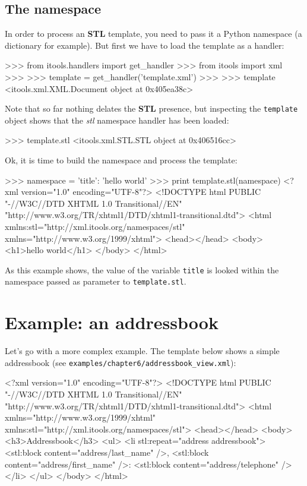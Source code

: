 \subsection{The namespace}

In order to process an {\bf STL} template, you need to pass it a Python
namespace (a dictionary for example). But first we have to load the template
as a handler:

\begin{code}
    >>> from itools.handlers import get_handler
    >>> from itools import xml
    >>>   
    >>> template = get_handler('template.xml')
    >>> 
    >>> template
    <itools.xml.XML.Document object at 0x405ea38c>
\end{code}

Note that so far nothing delates the {\bf STL} presence, but inspecting
the {\tt template} object shows that the {\em stl} namespace handler has
been loaded:

\begin{code}
    >>> template.stl
    <itools.xml.STL.STL object at 0x406516cc>
\end{code}

Ok, it is time to build the namespace and process the template:

\begin{code}
    >>> namespace = {'title': 'hello world'}
    >>> print template.stl(namespace)
    <?xml version="1.0" encoding="UTF-8"?>
    <!DOCTYPE html
         PUBLIC "-//W3C//DTD XHTML 1.0 Transitional//EN"
        "http://www.w3.org/TR/xhtml1/DTD/xhtml1-transitional.dtd">
    <html xmlns:stl="http://xml.itools.org/namespaces/stl"
          xmlns="http://www.w3.org/1999/xhtml">
      <head></head>
      <body>
        <h1>hello world</h1>
      </body>
    </html>
\end{code}


As this example shows, the value of the variable {\tt title} is looked within
the namespace passed as parameter to {\tt template.stl}.


\section{Example: an addressbook}

Let's go with a more complex example. The template below shows a simple
addressbook (see {\tt examples/chapter6/addressbook\_view.xml}):

\begin{code}
    <?xml version="1.0" encoding="UTF-8"?>
    <!DOCTYPE html
         PUBLIC "-//W3C//DTD XHTML 1.0 Transitional//EN"
         "http://www.w3.org/TR/xhtml1/DTD/xhtml1-transitional.dtd">
    <html xmlns="http://www.w3.org/1999/xhtml"
          xmlns:stl="http://xml.itools.org/namespaces/stl">
      <head></head>
      <body>
        <h3>Addressbook</h3>
        <ul>
          <li stl:repeat="address addressbook">
            <stl:block content="address/last_name" />,
            <stl:block content="address/first_name" />:
            <stl:block content="address/telephone" />
          </li>
        </ul>
      </body>
    </html>
\end{code}

